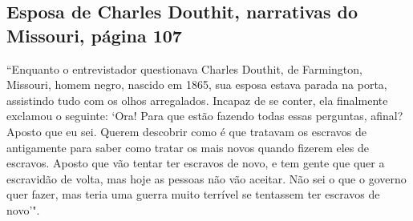 \subsection{Esposa de Charles Douthit, narrativas do Missouri, página 107} \label{ref75}

``Enquanto o entrevistador questionava Charles Douthit, de
Farmington, Missouri, homem negro, nascido em 1865, sua esposa estava
parada na porta, assistindo tudo com os olhos arregalados. Incapaz de se
conter, ela finalmente exclamou o seguinte: `Ora! Para que estão fazendo
todas essas perguntas, afinal? Aposto que eu sei. Querem descobrir como
é que tratavam os escravos de antigamente para saber como tratar os mais
novos quando fizerem eles de escravos. Aposto que vão tentar ter
escravos de novo, e tem gente que quer a escravidão de volta, mas hoje
as pessoas não vão aceitar. Não sei o que o governo quer fazer, mas
teria uma guerra muito terrível se tentassem ter escravos de novo'".

\pagebreak
\thispagestyle{empty}


